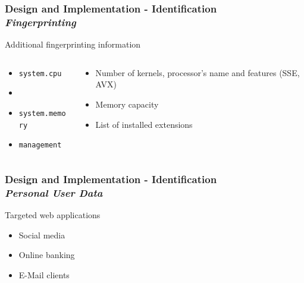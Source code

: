 \documentclass[accentcolor=tud9c,colorbacktitle,xcolor=dvipsnames]{tudbeamer}
\begin{document}
\begin{frame}
    \frametitle{Design and Implementation - Identification \\ \textit{Fingerprinting}}
    \begin{block}{Additional fingerprinting information}
    \begin{columns}[T]
        \begin{column}[T]{3.3cm}
            \begin{itemize}
                \item \texttt{system.cpu}
                \item[]
                \item \texttt{system.memory}
                \item \texttt{management}
            \end{itemize}
        \end{column}
        \begin{column}[T]{7cm}
            \begin{itemize}
                \item[] Number of kernels, processor's name and features (SSE, AVX)
                \item[] Memory capacity
                \item[] List of installed extensions
            \end{itemize}
        \end{column}
    \end{columns}
    \end{block}
\end{frame}
\begin{frame}
    \frametitle{Design and Implementation - Identification \\ \textit{Personal User Data}}
    \begin{block}{Targeted web applications}
        \begin{itemize}
            \item Social media
            \item Online banking
            \item E-Mail clients
        \end{itemize}
    \end{block}
\end{frame}
\end{document}
